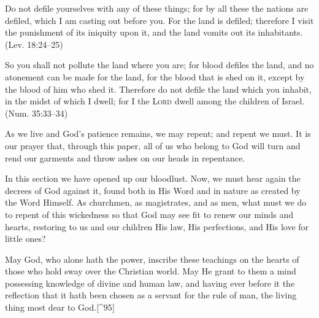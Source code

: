 \documentclass[
]{book}
\begin{document}
Do not defile yourselves with any of these things; for by all these the nations are defiled, which I am casting out before you. For the land is defiled; therefore I visit the punishment of its iniquity upon it, and the land vomits out its inhabitants. (Lev. 18:24--25)

So you shall not pollute the land where you are; for blood defiles the land, and no atonement can be made for the land, for the blood that is shed on it, except by the blood of him who shed it. Therefore do not defile the land which you inhabit, in the midst of which I dwell; for I the \textsc{Lord} dwell among the children of Israel. (Num. 35:33--34)

As we live and God's patience remains, we may repent; and repent we must. It is our prayer that, through this paper, all of us who belong to God will turn and rend our garments and throw ashes on our heads in repentance.

In this section we have opened up our bloodlust. Now, we must hear again the decrees of God against it, found both in His Word and in nature as created by the Word Himself. As churchmen, as magistrates, and as men, what must we do to repent of this wickedness so that God may see fit to renew our minds and hearts, restoring to us and our children His law, His perfections, and His love for little ones?

May God, who alone hath the power, inscribe these teachings on the hearts of those who hold sway over the Christian world. May He grant to them a mind possessing knowledge of divine and human law, and having ever before it the reflection that it hath been chosen as a servant for the rule of man, the living thing most dear to God.{[}\^{}95{]}
\end{document}
